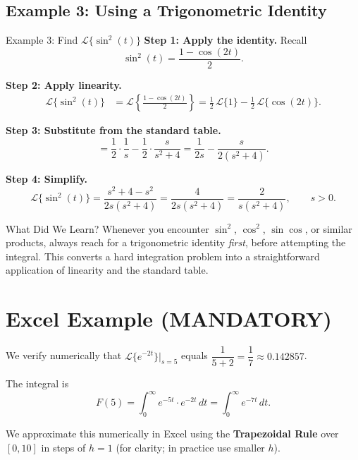 \documentclass[12pt,a4paper]{article}
\begin{document}
\subsection{Example 3: Using a Trigonometric Identity}

\begin{infobox}{Example 3: Find $\mathcal{L}\{\sin^2(t)\}$}
\textbf{Step 1: Apply the identity.} Recall
\[
\sin^2(t) = \frac{1 - \cos(2t)}{2}.
\]

\textbf{Step 2: Apply linearity.}
\begin{align*}
\mathcal{L}\{\sin^2(t)\}
  &= \mathcal{L}\left\{\frac{1 - \cos(2t)}{2}\right\}
   = \frac{1}{2}\,\mathcal{L}\{1\} - \frac{1}{2}\,\mathcal{L}\{\cos(2t)\}.
\end{align*}

\textbf{Step 3: Substitute from the standard table.}
\[
= \frac{1}{2}\cdot\frac{1}{s} - \frac{1}{2}\cdot\frac{s}{s^2+4}
= \frac{1}{2s} - \frac{s}{2(s^2+4)}.
\]

\textbf{Step 4: Simplify.}
\[
\mathcal{L}\{\sin^2(t)\}
  = \frac{s^2+4 - s^2}{2s(s^2+4)}
  = \frac{4}{2s(s^2+4)}
  = \frac{2}{s(s^2+4)}, \qquad s > 0.
\]
\end{infobox}

\begin{learnbox}{What Did We Learn?}
Whenever you encounter $\sin^2$, $\cos^2$, $\sin\cos$, or similar products, always reach for a trigonometric identity \emph{first}, before attempting the integral. This converts a hard integration problem into a straightforward application of linearity and the standard table.
\end{learnbox}

\section{Excel Example (MANDATORY)}

We verify numerically that $\mathcal{L}\{e^{-2t}\}\big|_{s=5}$ equals $\dfrac{1}{5+2} = \dfrac{1}{7} \approx 0.142857$.

The integral is
\[
F(5) = \int_0^{\infty} e^{-5t}\cdot e^{-2t}\,dt = \int_0^{\infty} e^{-7t}\,dt.
\]

We approximate this numerically in Excel using the \textbf{Trapezoidal Rule} over $[0, 10]$ in steps of $h = 1$ (for clarity; in practice use smaller $h$).

\medskip
\end{document}
